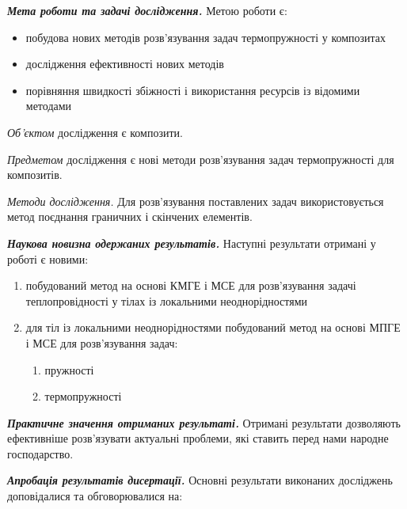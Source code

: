 \emph{\textbf{Мета роботи та задачі дослідження.}} Метою роботи є:

\begin{itemize}
\item
  побудова нових методів розв'язування задач термопружності у композитах
\item
  дослідження ефективності нових методів
\item
  порівняння швидкості збіжності і використання ресурсів із відомими
  методами
\end{itemize}

\emph{Об'єктом} дослідження є композити.

\emph{Предметом} дослідження є нові методи розв'язування задач
термопружності для композитів.

\emph{Методи дослідження.} Для розв'язування поставлених задач
використовується метод поєднання граничних і скінчених елементів.

\emph{\textbf{Наукова новизна одержаних результатів.}} Наступні
результати отримані у роботі є новими:

\begin{enumerate}
\def\labelenumi{\arabic{enumi}.}
\item
  побудований метод на основі КМГЕ і МСЕ для розв'язування задачі
  теплопровідності у тілах із локальними неоднорідностями
\item
  для тіл із локальними неоднорідностями побудований метод на основі
  МПГЕ і МСЕ для розв'язування задач:

  \begin{enumerate}
  \def\labelenumii{\alph{enumii}.}
  \item
    пружності
  \item
    термопружності
  \end{enumerate}
\end{enumerate}

\textbf{\emph{Практичне значення отриманих результаті.}} Отримані
результати дозволяють ефективніше розв'язувати актуальні проблеми, які
ставить перед нами народне господарство.

\emph{\textbf{Апробація результатів дисертації.}} Основні результати
виконаних досліджень доповідалися та обговорювалися на:

